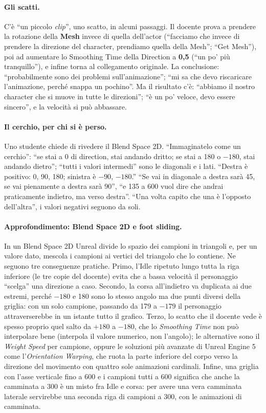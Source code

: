 \paragraph{Gli scatti.} C'è ``un piccolo \emph{clip}'', uno scatto, in alcuni passaggi.
Il docente prova a prendere la rotazione della \textbf{Mesh} invece di quella
dell'actor (``facciamo che invece di prendere la direzione del character, prendiamo
quella della Mesh''; ``Get Mesh''), poi ad aumentare lo Smoothing Time della Direction
a \textbf{0,5} (``un po' più tranquillo''), e infine torna al collegamento originale.
La conclusione: ``probabilmente sono dei problemi sull'animazione''; ``mi sa che devo
riscaricare l'animazione, perché snappa un pochino''. Ma il risultato c'è: ``abbiamo il
nostro character che si muove in tutte le direzioni''; ``è un po' veloce, devo essere
sincero'', e la velocità si può abbassare.

\paragraph{Il cerchio, per chi si è perso.} Uno studente chiede di rivedere il Blend
Space 2D. ``Immaginatelo come un cerchio'': ``se stai a 0 di direction, stai andando
dritto; se stai a 180 o $-180$, stai andando dietro''; ``tutti i valori intermedi'' sono le
diagonali e i lati. ``Destra è positivo: 0, 90, 180; sinistra è $-90$, $-180$.'' ``Se vai
in diagonale a destra sarà 45, se vai pienamente a destra sarà 90'', ``e 135 a 600 vuol
dire che andrai praticamente indietro, ma verso destra''. ``Una volta capito che una è
l'opposto dell'altra'', i valori negativi seguono da soli.

\paragraph{Approfondimento: Blend Space 2D e foot sliding.} In un Blend Space 2D Unreal
divide lo spazio dei campioni in triangoli e, per un valore dato, mescola i campioni ai
vertici del triangolo che lo contiene. Ne seguono tre conseguenze pratiche. Primo,
l'Idle ripetuto lungo tutta la riga inferiore (le tre copie del docente) evita che a
bassa velocità il personaggio ``scelga'' una direzione a caso. Secondo, la corsa
all'indietro va duplicata ai due estremi, perché $-180$ e 180 sono lo stesso angolo ma
due punti diversi della griglia: con un solo campione, passando da 179 a $-179$ il
personaggio attraverserebbe in un istante tutto il grafico. Terzo, lo scatto che il
docente vede è spesso proprio quel salto da $+180$ a $-180$, che lo \emph{Smoothing
Time} non può interpolare bene (interpola il valore numerico, non l'angolo); le
alternative sono il \emph{Weight Speed} per campione, oppure le soluzioni più avanzate
di Unreal Engine 5 come l'\emph{Orientation Warping}, che ruota la parte inferiore del
corpo verso la direzione del movimento con quattro sole animazioni cardinali. Infine,
una griglia con l'asse verticale fino a 600 e i campioni tutti a 600 significa che anche
la camminata a 300 è un misto fra Idle e corsa: per avere una vera camminata laterale
servirebbe una seconda riga di campioni a 300, con le animazioni di camminata.

